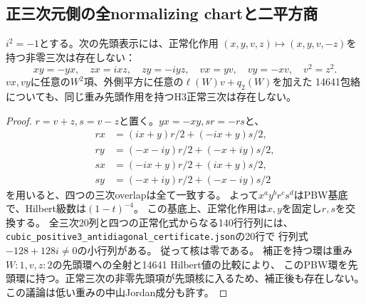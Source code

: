 \subsection{正三次元側の全normalizing chartと二平方商}
\label{subsec:h3-positive3-normalizing}
\begin{lemma}\label{lem:h3-positive3-quaternion-chart}
$i^2=-1$とする。次の先頭表示には、正常化作用
$(x,y,v,z)\mapsto(x,y,v,-z)$を持つ非零三次は存在しない：
\[
 xy=-yx,\quad zx=ixz,\quad zy=-iyz,\quad
 vx=yv,\quad vy=-xv,\quad v^2=z^2.
\]
$vx,vy$に任意の$W^2$項、外側平方に任意の$\ell(W)v+q_2(W)$を加えた
14641包絡についても、同じ重み先頭作用を持つH3正常三次は存在しない。
\end{lemma}
\begin{proof}
$r=v+z,s=v-z$と置く。$yx=-xy,sr=-rs$と、
\begin{align*}
 rx&=(ix+y)r/2+(-ix+y)s/2,\\
 ry&=(-x-iy)r/2+(-x+iy)s/2,\\
 sx&=(-ix+y)r/2+(ix+y)s/2,\\
 sy&=(-x+iy)r/2+(-x-iy)s/2
\end{align*}
を用いると、四つの三次overlapは全て一致する。
よって$x^ay^br^cs^d$はPBW基底で、Hilbert級数は$(1-t)^{-4}$。
この基底上、正常化作用は$x,y$を固定し$r,s$を交換する。
全三次20列と四つの正常化式からなる140行行列には、
\texttt{cubic\_positive3\_antidiagonal\_certificate.json}の20行で
行列式$-128+128i\ne0$の小行列がある。
従って核は零である。
補正を持つ環は重み$W:1,v,z:2$の先頭環への全射と14641 Hilbert値の比較により、
このPBW環を先頭環に持つ。正常三次の非零先頭項が先頭核に入るため、補正後も存在しない。
この議論は低い重みの中山Jordan成分も許す。
\end{proof}

